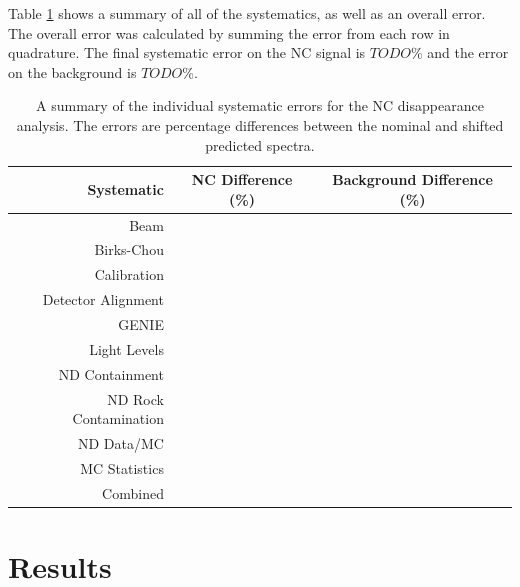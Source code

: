 Table \ref{tab:SystSummary} shows a summary of all of the systematics, as well as an overall error. The overall error was calculated by summing the error from each row in quadrature. The final systematic error on the NC signal is $TODO\%$ and the error on the background is $TODO\%$.
\begin{table}[h]
  \begin{center}
    \caption[Systematic Error Summary]{A summary of the individual systematic errors for the NC disappearance analysis. The errors are percentage differences between the nominal and shifted predicted spectra.}
    \label{tab:SystSummary}
    \begin{tabular}{r c c}
      \hline\hline
      Systematic & NC Difference (\%) & Background Difference (\%) \\
      \hline
      Beam & & \\
      Birks-Chou & & \\
      Calibration & & \\
      Detector Alignment & & \\
      GENIE & & \\
      Light Levels & & \\
      ND Containment & & \\
      ND Rock Contamination & & \\
      ND Data/MC & & \\
      MC Statistics & & \\
      \hline
      Combined & & \\
      \hline
    \end{tabular}
  \end{center}
\end{table}

\section{Results}